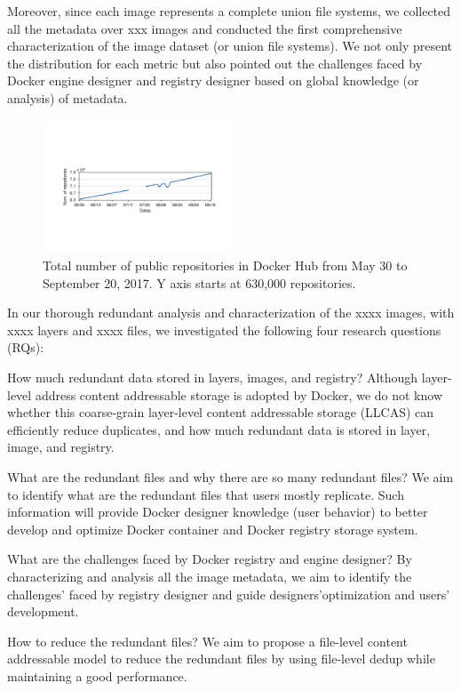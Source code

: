 Moreover, since each image represents a complete union file systems, we collected all the metadata over xxx images and  
conducted the first comprehensive characterization of the image dataset (or union file systems). 
We not only present the distribution for each metric but also pointed out the challenges faced by Docker engine designer and registry designer based on global knowledge (or analysis) of metadata.
   
\begin{figure}
	\centering
	\includegraphics[width=0.5\textwidth]{graphs/image_growth.pdf}
	\caption{Total number of public repositories in Docker Hub
		from May 30 to September 20, 2017. Y axis starts
		at 630,000 repositories.
	}
	\label{fig_image_growth}
\end{figure}

In our thorough redundant analysis and characterization of the xxxx images, with xxxx layers and xxxx files, we investigated the following four research questions (RQs):

\begin{compactitemize}
	\item How much redundant data stored in layers, images, and registry? Although layer-level address content addressable storage is adopted by Docker, we do not know whether  
	this coarse-grain layer-level content addressable storage (LLCAS) can efficiently reduce duplicates, and how much redundant data is stored in layer, image, and registry.
	\item What are the redundant files and why there are so many redundant files? We aim to identify what are the redundant files that users mostly replicate. Such information will provide Docker designer knowledge (user behavior) to better develop and optimize Docker container and Docker registry storage system.
	\item What are the challenges faced by Docker registry and engine designer? By characterizing and analysis all the image metadata, we aim to identify the challenges' faced by registry designer and guide designers'optimization and users' development.  
	\item How to reduce the redundant files? We aim to propose a file-level content addressable model to reduce the redundant files by using file-level dedup while maintaining a good performance.
\end{compactitemize}

